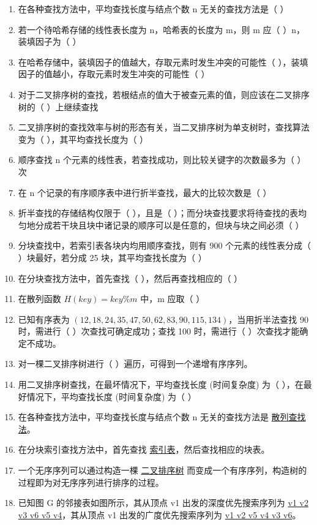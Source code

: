 \documentclass[12pt, a4paper]{article}
\begin{document}
\begin{enumerate}
	\item 在各种查找方法中，平均查找长度与结点个数 n 无关的查找方法是（ ）
	\item 若一个待哈希存储的线性表长度为 n，哈希表的长度为 m，则 m 应（ ）n，装填因子为（ ）
	\item 在哈希存储中，装填因子的值越大，存取元素时发生冲突的可能性（ ），装填因子的值越小，存取元素时发生冲突的可能性（ ）
	\item 对于二叉排序树的查找，若根结点的值大于被查元素的值，则应该在二叉排序树的（ ）上继续查找
	\item 二叉排序树的查找效率与树的形态有关，当二叉排序树为单支树时，查找算法变为（ ），其平均查找长度为（ ）
	\item 顺序查找 n 个元素的线性表，若查找成功，则比较关键字的次数最多为（ ）次
	\item 在 n 个记录的有序顺序表中进行折半查找，最大的比较次数是（ ）
	\item 折半查找的存储结构仅限于（ ），且是（ ）；而分块查找要求将待查找的表均匀地分成若干块且块中诸记录的顺序可以是任意的，但块与块之间必须（ ）
	\item 分块查找中，若索引表各块内均用顺序查找，则有 900 个元素的线性表分成（ ）块最好，若分成 25 块，其平均查找长度为（ ）
	\item 在分块查找方法中，首先查找（ ），然后再查找相应的（ ）
	\item 在散列函数 $H(key)=key \% m$ 中，m 应取（ ）
	\item 已知有序表为 $(12, 18, 24, 35, 47, 50, 62, 83, 90, 115, 134)$，当用折半法查找 90 时，需进行（ ）次查找可确定成功；查找 100 时，需进行（ ）次查找才能确定不成功。
	\item 对一棵二叉排序树进行（ ）遍历，可得到一个递增有序序列。
	\item 用二叉排序树查找，在最坏情况下，平均查找长度 (时间复杂度) 为（ ），在最好情况下，平均查找长度 (时间复杂度) 为（ ）
	\item 在各种查找方法中，平均查找长度与结点个数 n 无关的查找方法是 \underline{散列查找法}。
	\item 在分块索引查找方法中，首先查找 \underline{索引表}，然后查找相应的块表。
	\item 一个无序序列可以通过构造一棵 \underline{二叉排序树} 而变成一个有序序列，构造树的过程即为对无序序列进行排序的过程。
	\item 已知图 G 的邻接表如图所示，其从顶点 v1 出发的深度优先搜索序列为 \underline{v1 v2 v3 v6 v5 v4}，其从顶点 v1 出发的广度优先搜索序列为 \underline{v1 v2 v5 v4 v3 v6}。

\end{enumerate}
\end{document}
